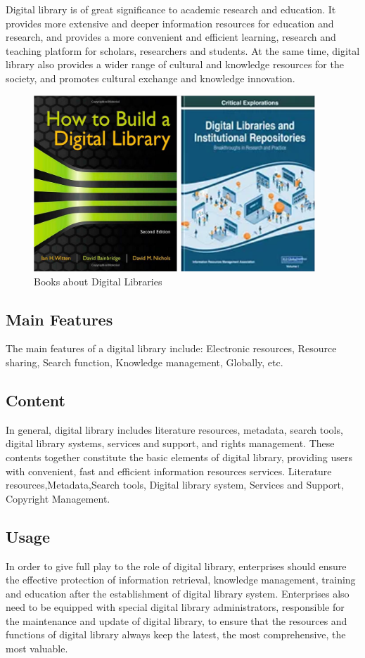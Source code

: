Digital library is of great significance to academic research and education. It provides more extensive and deeper information resources for education and research, and provides a more convenient and efficient learning, research and teaching platform for scholars, researchers and students. At the same time, digital library also provides a wider range of cultural and knowledge resources for the society, and promotes cultural exchange and knowledge innovation.

\begin{figure}[htbp]
  \centerline{\includegraphics[width=300pt]{images/M1-2-2.png}}
  \caption{Books about Digital Libraries}
\end{figure}

\subsection{Main Features}
The main features of a digital library include:
Electronic resources, Resource sharing, Search function, Knowledge management, Globally, etc\cite{Internat75:online}.

\subsection{Content}
In general, digital library includes literature resources, metadata, search tools, digital library systems, services and support, and rights management. These contents together constitute the basic elements of digital library, providing users with convenient, fast and efficient information resources services.
Literature resources,Metadata,Search tools, Digital library system, Services and Support, Copyright Management.

\subsection{Usage}
In order to give full play to the role of digital library, enterprises should ensure the effective protection of information retrieval, knowledge management, training and education after the establishment of digital library system. Enterprises also need to be equipped with special digital library administrators, responsible for the maintenance and update of digital library, to ensure that the resources and functions of digital library always keep the latest, the most comprehensive, the most valuable.

